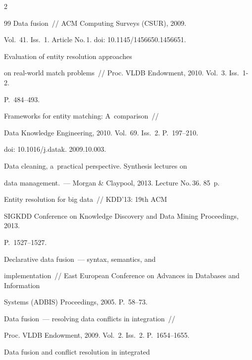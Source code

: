 \begin{multicols}{2}
{{\begin{thebibliography}{99}
 Data fusion~// ACM Computing Surveys (CSUR), 2009.

Vol.~41. Iss.~1. Article No.\,1. doi: 10.1145/1456650.1456651.






 Evaluation of entity resolution approaches

on real-world match problems~// Proc. VLDB Endowment, 2010. Vol.~3. Iss.~1-2.

P.~484--493.


 Frameworks for entity matching: A~comparison~//

Data Knowledge Engineering, 2010. Vol.~69. Iss.~2. P.~197--210.

doi: 10.1016/j.datak. 2009.10.003.


 Data cleaning, a~practical perspective. Synthesis lectures on

data management.~--- Morgan \& Claypool, 2013. Lecture No.\,36. 85~p.


 Entity resolution for big data~// KDD'13: 19th ACM

SIGKDD Conference on Knowledge Discovery and Data Mining Proceedings, 2013.

P.~1527--1527.




 Declarative data fusion~--- syntax, semantics, and

implementation~// East European Conference on Advances in Databases and Information

Systems (ADBIS) Proceedings, 2005. P.~58--73.




 Data fusion~--- resolving data conflicts in integration~//

Proc. VLDB Endowment, 2009. Vol.~2. Iss.~2. P.~1654--1655.




 Data fusion and conflict resolution in integrated


\end{thebibliography}}}
\end{multicols}
